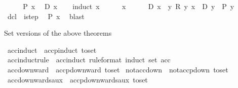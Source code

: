 \begin{isabellebody}
\ \ \isamarkupfalse%
\ \isamarkupfalse%
\ {\isachardoublequoteopen}P\ x{\isachardoublequoteclose}\ \isamarkupfalse%
\ {\isacartoucheopen}D\ x{\isacartoucheclose}\isanewline
\ \ \isamarkupfalse%
\ {\isacharparenleft}{\kern0pt}induct\ x{\isacharparenright}{\kern0pt}\isanewline
\ \ \ \ \isamarkupfalse%
\ x\isanewline
\ \ \ \ \isamarkupfalse%
\ {\isachardoublequoteopen}D\ x{\isachardoublequoteclose}\ \ {\isachardoublequoteopen}{\isasymAnd}y{\isachardot}{\kern0pt}\ R\ y\ x\ {\isasymLongrightarrow}\ D\ y\ {\isasymLongrightarrow}\ P\ y{\isachardoublequoteclose}\isanewline
\ \ \ \ \isamarkupfalse%
\ dcl\ \ istep\ \isamarkupfalse%
\ {\isachardoublequoteopen}P\ x{\isachardoublequoteclose}\ \isamarkupfalse%
\ blast\isanewline
\ \ \isamarkupfalse%
\isanewline
{}\isamarkupfalse%
%
\endisatagproof
{\isafoldproof}%
%
\isadelimproof
%
\endisadelimproof
%
\begin{isamarkuptext}%
Set versions of the above theorems%
\end{isamarkuptext}\isamarkuptrue%
\isamarkupfalse%
\ acc{\isacharunderscore}{\kern0pt}induct\ {\isacharequal}{\kern0pt}\ accp{\isacharunderscore}{\kern0pt}induct\ {\isacharbrackleft}{\kern0pt}to{\isacharunderscore}{\kern0pt}set{\isacharbrackright}{\kern0pt}\isanewline
{}\isamarkupfalse%
\ acc{\isacharunderscore}{\kern0pt}induct{\isacharunderscore}{\kern0pt}rule\ {\isacharequal}{\kern0pt}\ acc{\isacharunderscore}{\kern0pt}induct\ {\isacharbrackleft}{\kern0pt}rule{\isacharunderscore}{\kern0pt}format{\isacharcomma}{\kern0pt}\ induct\ set{\isacharcolon}{\kern0pt}\ acc{\isacharbrackright}{\kern0pt}\isanewline
{}\isamarkupfalse%
\ acc{\isacharunderscore}{\kern0pt}downward\ {\isacharequal}{\kern0pt}\ accp{\isacharunderscore}{\kern0pt}downward\ {\isacharbrackleft}{\kern0pt}to{\isacharunderscore}{\kern0pt}set{\isacharbrackright}{\kern0pt}\isanewline
{}\isamarkupfalse%
\ not{\isacharunderscore}{\kern0pt}acc{\isacharunderscore}{\kern0pt}down\ {\isacharequal}{\kern0pt}\ not{\isacharunderscore}{\kern0pt}accp{\isacharunderscore}{\kern0pt}down\ {\isacharbrackleft}{\kern0pt}to{\isacharunderscore}{\kern0pt}set{\isacharbrackright}{\kern0pt}\isanewline
{}\isamarkupfalse%
\ acc{\isacharunderscore}{\kern0pt}downwards{\isacharunderscore}{\kern0pt}aux\ {\isacharequal}{\kern0pt}\ accp{\isacharunderscore}{\kern0pt}downwards{\isacharunderscore}{\kern0pt}aux\ {\isacharbrackleft}{\kern0pt}to{\isacharunderscore}{\kern0pt}set{\isacharbrackright}{\kern0pt}\isanewline

\end{isabellebody}
